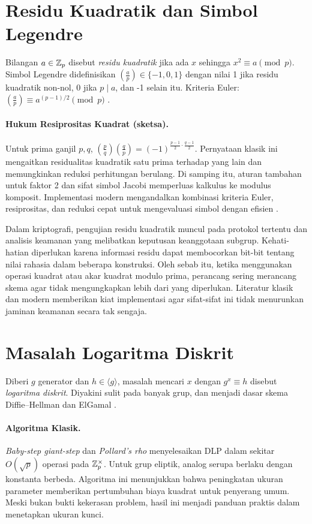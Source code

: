 \documentclass[../main.tex]{subfiles}
\begin{document}
\section{Residu Kuadratik dan Simbol Legendre}
Bilangan \(a\in\mathbb{Z}_p\) disebut \emph{residu kuadratik} jika ada \(x\) sehingga \(x^2\equiv a\pmod p\). Simbol Legendre didefinisikan \(\left(\tfrac{a}{p}\right)\in\{-1,0,1\}\) dengan nilai 1 jika residu kuadratik non-nol, 0 jika \(p\mid a\), dan -1 selain itu. Kriteria Euler: \(\left(\tfrac{a}{p}\right)\equiv a^{(p-1)/2}\pmod p\) \citep{hoffstein}.

\paragraph{Hukum Resiprositas Kuadrat (sketsa).} Untuk prima ganjil \(p,q\), \(\left(\tfrac{p}{q}\right)\left(\tfrac{q}{p}\right)=(-1)^{\frac{p-1}{2}\cdot\frac{q-1}{2}}\). Pernyataan klasik ini mengaitkan residualitas kuadratik satu prima terhadap yang lain dan memungkinkan reduksi perhitungan berulang. Di samping itu, aturan tambahan untuk faktor 2 dan sifat simbol Jacobi memperluas kalkulus ke modulus komposit. Implementasi modern mengandalkan kombinasi kriteria Euler, resiprositas, dan reduksi cepat untuk mengevaluasi simbol dengan efisien \citep{shoup_nt}.

Dalam kriptografi, pengujian residu kuadratik muncul pada protokol tertentu dan analisis keamanan yang melibatkan keputusan keanggotaan subgrup. Kehati-hatian diperlukan karena informasi residu dapat membocorkan bit-bit tentang nilai rahasia dalam beberapa konstruksi. Oleh sebab itu, ketika menggunakan operasi kuadrat atau akar kuadrat modulo prima, perancang sering merancang skema agar tidak mengungkapkan lebih dari yang diperlukan. Literatur klasik dan modern memberikan kiat implementasi agar sifat-sifat ini tidak menurunkan jaminan keamanan secara tak sengaja.

\section{Masalah Logaritma Diskrit}
Diberi \(g\) generator dan \(h\in\langle g\rangle\), masalah mencari \(x\) dengan \(g^x\equiv h\) disebut \emph{logaritma diskrit}. Diyakini sulit pada banyak grup, dan menjadi dasar skema Diffie--Hellman dan ElGamal \citep{diffiehellman,hoffstein}.

\paragraph{Algoritma Klasik.} \emph{Baby-step giant-step} dan \emph{Pollard's rho} menyelesaikan DLP dalam sekitar \(O(\sqrt{p})\) operasi pada \(\mathbb{Z}_p^\times\). Untuk grup eliptik, analog serupa berlaku dengan konstanta berbeda. Algoritma ini menunjukkan bahwa peningkatan ukuran parameter memberikan pertumbuhan biaya kuadrat untuk penyerang umum. Meski bukan bukti kekerasan problem, hasil ini menjadi panduan praktis dalam menetapkan ukuran kunci.
\end{document}
